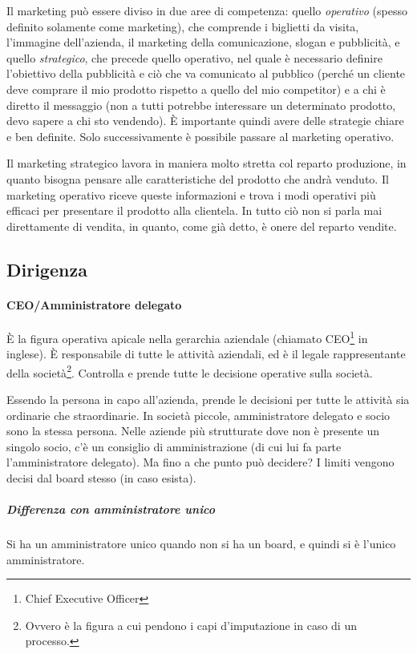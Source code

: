 Il marketing può essere diviso in due aree di competenza: quello
\textit{operativo} (spesso definito solamente come marketing), che comprende i
biglietti da visita, l'immagine dell'azienda, il marketing della comunicazione,
slogan e pubblicità, e quello \textit{strategico}, che precede quello
operativo, nel quale è necessario definire l'obiettivo della pubblicità e ciò
che va comunicato al pubblico (perché un cliente deve comprare il mio prodotto
rispetto a quello del mio competitor) e a chi è diretto il messaggio (non a
tutti potrebbe interessare un determinato prodotto, devo sapere a chi sto
vendendo). È importante quindi avere delle strategie chiare e ben definite.
Solo successivamente è possibile passare al marketing operativo.

Il marketing strategico lavora in maniera molto stretta col reparto produzione,
in quanto bisogna pensare alle caratteristiche del prodotto che andrà venduto.
Il marketing operativo riceve queste informazioni e trova i modi operativi più
efficaci per presentare il prodotto alla clientela. In tutto ciò non si parla
mai direttamente di vendita, in quanto, come già detto, è onere del reparto
vendite.

\subsection{Dirigenza}

\paragraph*{CEO/Amministratore delegato} È la figura operativa apicale nella
gerarchia aziendale (chiamato CEO\footnote{Chief Executive Officer} in
inglese). È responsabile di tutte le attività aziendali, ed è il legale
rappresentante della società\footnote{Ovvero è la figura a cui pendono i capi
d'imputazione in caso di un processo.}. Controlla e prende tutte le decisione
operative sulla società.

Essendo la persona in capo all'azienda, prende le decisioni per tutte le
attività sia ordinarie che straordinarie. In società piccole,
amministratore delegato e socio sono la stessa persona. Nelle aziende più
strutturate dove non è presente un singolo socio, c'è un consiglio di
amministrazione (di cui lui fa parte l'amministratore delegato).
Ma fino a che punto può decidere? I limiti vengono decisi dal board stesso (in
caso esista).

\subparagraph*{Differenza con amministratore unico} Si ha un amministratore
unico quando non si ha un board, e quindi si è l'unico amministratore.

